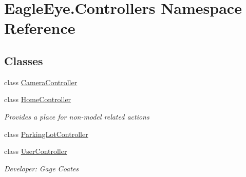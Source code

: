 \hypertarget{namespace_eagle_eye_1_1_controllers}{}\section{Eagle\+Eye.\+Controllers Namespace Reference}
\label{namespace_eagle_eye_1_1_controllers}
\subsection*{Classes}
\begin{DoxyCompactItemize}
\item 
class \mbox{\hyperlink{class_eagle_eye_1_1_controllers_1_1_camera_controller}{Camera\+Controller}}
\item 
class \mbox{\hyperlink{class_eagle_eye_1_1_controllers_1_1_home_controller}{Home\+Controller}}
\begin{DoxyCompactList}\small\item\em Provides a place for non-\/model related actions \end{DoxyCompactList}\item 
class \mbox{\hyperlink{class_eagle_eye_1_1_controllers_1_1_parking_lot_controller}{Parking\+Lot\+Controller}}
\item 
class \mbox{\hyperlink{class_eagle_eye_1_1_controllers_1_1_user_controller}{User\+Controller}}
\begin{DoxyCompactList}\small\item\em Developer\+: Gage Coates \end{DoxyCompactList}\end{DoxyCompactItemize}
